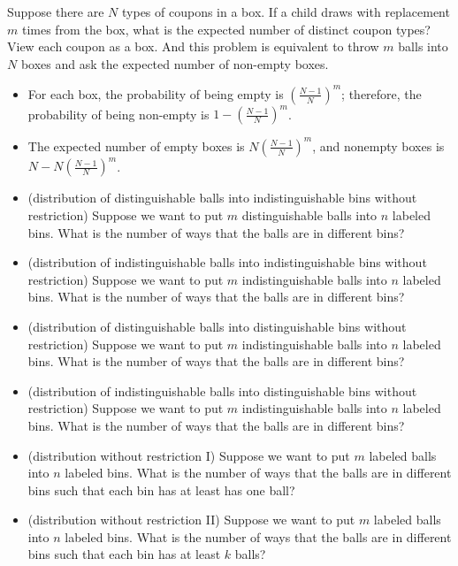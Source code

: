 \begin{refsection}
\begin{example}
	Suppose there are $N$ types of coupons in a box. If a child draws with replacement $m$ times from the box, what is the expected number of distinct coupon types?\\
	
	View each coupon as a box. And this problem is equivalent to throw $m$ balls into $N$ boxes and ask the expected number of non-empty boxes. 
	
	\begin{itemize}
		\item For each box, the probability of being empty is $(\frac{N-1}{N})^m$; therefore, the probability of being non-empty is $1- (\frac{N-1}{N})^m$.
		\item The expected number of empty boxes is $N(\frac{N-1}{N})^m$, and nonempty boxes is $N - N(\frac{N-1}{N})^m$.
	\end{itemize}
\end{example}


\begin{definition}
\begin{itemize}
	\item (distribution of distinguishable balls into indistinguishable bins without restriction) Suppose we want to put $m$ distinguishable balls into $n$ labeled bins. What is the number of   ways that the balls are in different bins?
	\item (distribution of indistinguishable balls into indistinguishable bins without restriction) Suppose we want to put $m$ indistinguishable balls into $n$ labeled bins. What is the number of   ways that the balls are in different bins?
	\item (distribution of distinguishable balls into distinguishable bins without restriction) Suppose we want to put $m$ indistinguishable balls into $n$ labeled bins. What is the number of   ways that the balls are in different bins?
	\item (distribution of indistinguishable balls into distinguishable bins without restriction) Suppose we want to put $m$ indistinguishable balls into $n$ labeled bins. What is the number of   ways that the balls are in different bins?
	
	\item (distribution without restriction I) Suppose we want to put $m$ labeled balls into $n$ labeled bins. What is the number of   ways that the balls are in different bins such that each bin has at least has one ball?
	\item (distribution without restriction II) Suppose we want to put $m$ labeled balls into $n$ labeled bins. What is the number of   ways that the balls are in different bins such that each bin has at least $k$ balls?
\end{itemize}	
 	

\end{definition}
\end{refsection}
